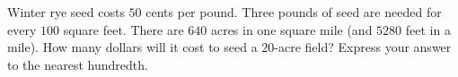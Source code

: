 Winter rye seed costs $50$ cents per pound. Three pounds of seed are needed for every $100$ square feet. There are $640$ acres in one square mile (and $5280$ feet in a mile). How many dollars will it cost to seed a $20$-acre field? Express your answer to the nearest hundredth.
